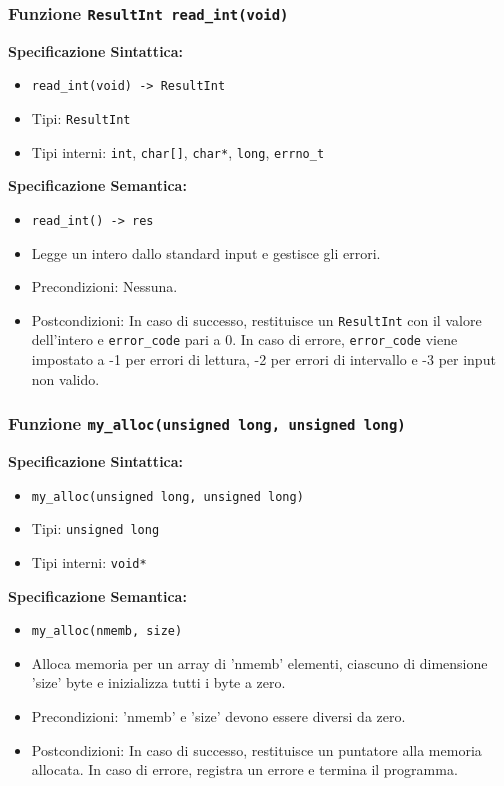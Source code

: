 \documentclass[11pt]{scrartcl} %
\begin{document}
\subsubsection{Funzione \texttt{ResultInt read\_int(void)}}

\textbf{Specificazione Sintattica:}
\begin{itemize}
	\item \texttt{read\_int(void) -> ResultInt}
	\item Tipi: \texttt{ResultInt}
	\item Tipi interni: \texttt{int}, \texttt{char[]}, \texttt{char*}, \texttt{long}, \texttt{errno\_t}
\end{itemize}

\textbf{Specificazione Semantica:}
\begin{itemize}
	\item \texttt{read\_int() -> res}
	\item Legge un intero dallo standard input e gestisce gli errori.
	\item Precondizioni: Nessuna.
	\item Postcondizioni: In caso di successo, restituisce un \texttt{ResultInt} con il valore dell'intero e \texttt{error\_code} pari a 0. In caso di errore, \texttt{error\_code} viene impostato a -1 per errori di lettura, -2 per errori di intervallo e -3 per input non valido.
\end{itemize}

\subsubsection{Funzione \texttt{my\_alloc(unsigned long, unsigned long)}}

\textbf{Specificazione Sintattica:}
\begin{itemize}
	\item \texttt{my\_alloc(unsigned long, unsigned long)}
	\item Tipi: \texttt{unsigned long}
	\item Tipi interni: \texttt{void*}
\end{itemize}

\textbf{Specificazione Semantica:}
\begin{itemize}
	\item \texttt{my\_alloc(nmemb, size)}
	\item Alloca memoria per un array di 'nmemb' elementi, ciascuno di dimensione 'size' byte e inizializza tutti i byte a zero.
	\item Precondizioni: 'nmemb' e 'size' devono essere diversi da zero.
	\item Postcondizioni: In caso di successo, restituisce un puntatore alla memoria allocata. In caso di errore, registra un errore e termina il programma.
\end{itemize}
\end{document}
